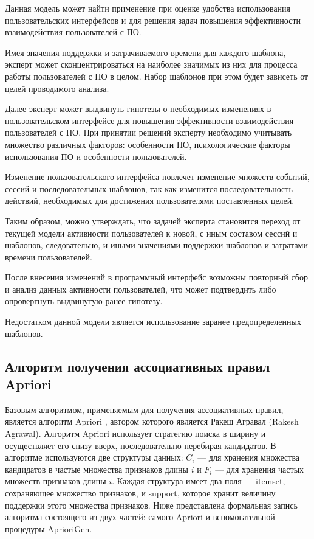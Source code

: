 Данная модель может найти применение при оценке удобства использования пользовательских интерфейсов и для решения задач повышения эффективности взаимодействия пользователей с ПО.

Имея значения поддержки и затрачиваемого времени для каждого шаблона, эксперт может сконцентрироваться на наиболее значимых из них
для процесса работы пользователей с ПО в целом. Набор шаблонов при этом будет зависеть от целей проводимого анализа.

Далее эксперт может выдвинуть гипотезы о необходимых изменениях в пользовательском интерфейсе для повышения эффективности взаимодействия пользователей с ПО. При принятии решений эксперту необходимо учитывать множество различных факторов: особенности ПО, психологические факторы использования ПО и особенности пользователей.

Изменение пользовательского интерфейса повлечет изменение множеств событий, сессий и последовательных шаблонов, так как изменится
последовательность действий, необходимых для достижения пользователями поставленных целей.

Таким образом, можно утверждать, что задачей эксперта становится переход от текущей модели активности пользователей к новой, с иным составом сессий и шаблонов, следовательно, и иными значениями поддержки шаблонов и затратами времени пользователей.

После внесения изменений в программный интерфейс возможны повторный сбор и анализ данных активности пользователей, что может подтвердить либо опровергнуть выдвинутую ранее гипотезу.

Недостатком данной модели является использование заранее предопределенных шаблонов.

\subsection{Алгоритм получения ассоциативных правил Apriori}
Базовым алгоритмом, применяемым для получения ассоциативных правил, является алгоритм Apriori \cite{34}, автором которого является Ракеш Агравал (Rakesh Agrawal). Алгоритм Apriori использует стратегию поиска в ширину и осуществляет его снизу-вверх, последовательно перебирая кандидатов.
В алгоритме используются две структуры данных: $C_i$ — для хранения множества кандидатов в частые множества признаков длины $i$ и $F_i$ — для хранения частых множеств признаков длины $i$. Каждая структура имеет два поля — itemset, сохраняющее множество признаков, и support, которое хранит величину поддержки этого множества признаков. Ниже представлена формальная запись алгоритма состоящего из двух частей: самого Apriori и вспомогательной процедуры AprioriGen. 

